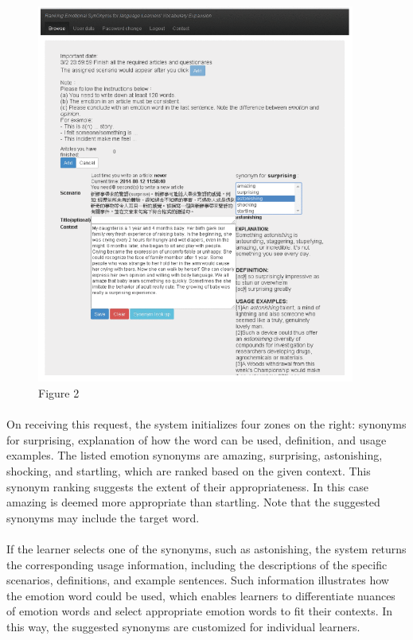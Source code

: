\documentclass[a4paper,12pt,oneside]{article}
\begin{document}
\begin{figure}[H]
\includegraphics[height=12.5cm,width=10.46cm]{Figure2.png}
\centering
\caption{Figure 2}
\end{figure}

\paragraph{}
On receiving this request, the system initializes four zones on the right: synonyms for surprising, explanation of how the word can be used, definition, and usage examples. The listed emotion synonyms are amazing, surprising, astonishing, shocking, and startling, which are ranked based on the given context. This synonym ranking suggests the extent of their appropriateness. In this case amazing is deemed more appropriate than startling. Note that the suggested synonyms may include the target word. 
\paragraph{}
If the learner selects one of the synonyms, such as astonishing, the system returns the corresponding usage information, including the descriptions of the specific scenarios, definitions, and example sentences. Such information illustrates how the emotion word could be used, which enables learners to differentiate nuances of emotion words and select appropriate emotion words to fit their contexts. In this way, the suggested synonyms are customized for individual learners. 
\end{document}
